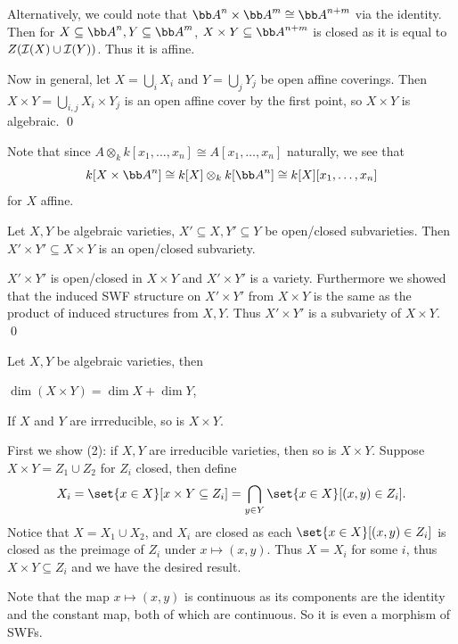     Alternatively, we could note that $\bA^n\times\bA^m\cong\bA^{n+m}$ via the identity.
    Then for $X\subseteq\bA^n,Y\subseteq\bA^m$, $X\times Y\subseteq\bA^{n+m}$ is closed as it is equal to $Z({{\cal I}}(X)\cup{{\cal I}}(Y))$.
    Thus it is affine.

    Now in general, let $X=\bigcup_iX_i$ and $Y=\bigcup_jY_j$ be open affine coverings.
    Then $X\times Y=\bigcup_{i,j}X_i\times Y_j$ is an open affine cover by the first point, so $X\times Y$ is algebraic.
    \qed

\eproof

Note that since $A\otimes_kk[x_1,\dots,x_n]\cong A[x_1,\dots,x_n]$ naturally, we see that
$$ k[X\times\bA^n] \cong k[X]\otimes_kk[\bA^n] \cong k[X][x_1,\dots,x_n] $$
for $X$ affine.

\bcoro

    Let $X,Y$ be algebraic varieties, $X'\subseteq X,Y'\subseteq Y$ be open/closed subvarieties.
    Then $X'\times Y'\subseteq X\times Y$ is an open/closed subvariety.

\ecoro

\bproof

    $X'\times Y'$ is open/closed in $X\times Y$ and $X'\times Y'$ is a variety.
    Furthermore we showed that the induced SWF structure on $X'\times Y'$ from $X\times Y$ is the same as the product of induced structures
    from $X,Y$.
    Thus $X'\times Y'$ is a subvariety of $X\times Y$.
    \qed

\eproof

\bprop

    Let $X,Y$ be algebraic varieties, then
    \benum
        \item $\dim(X\times Y)=\dim X+\dim Y$,
        \item If $X$ and $Y$ are irrreducible, so is $X\times Y$.
    \eenum

\eprop

\bproof

    First we show (2): if $X,Y$ are irreducible varieties, then so is $X\times Y$.
    Suppose $X\times Y=Z_1\cup Z_2$ for $Z_i$ closed, then define
    $$ X_i = \set{x\in X}[x\times Y\subseteq Z_i] = \bigcap_{y\in Y}\set{x\in X}[(x,y)\in Z_i]. $$
    Notice that $X=X_1\cup X_2$, and $X_i$ are closed as each $\set{x\in X}[(x,y)\in Z_i]$ is closed as the preimage of $Z_i$
    under $x\mapsto(x,y)$.
    Thus $X=X_i$ for some $i$, thus $X\times Y\subseteq Z_i$ and we have the desired result.

    Note that the map $x\mapsto(x,y)$ is continuous as its components are the identity and the constant map, both of which are continuous.
    So it is even a morphism of SWFs.

